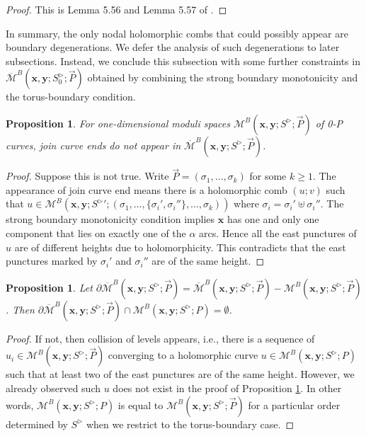 \documentclass{amsart}
\newtheorem{prop}[thm]{Proposition}
\theoremstyle{definition}
\theoremstyle{remark}
\numberwithin{equation}{section}
\numberwithin{equation}{section} \makeatletter
\begin{document}
\begin{proof}
This is Lemma 5.56 and Lemma 5.57 of \cite{LOT18}.
\end{proof}

In summary, the only nodal holomorphic combs that could possibly appear are boundary degenerations. We defer the analysis of such degenerations to later subsections. Instead, we conclude this subsection with some further constraints in $\overline{\mathcal{M}}^B(\bm{x},\bm{y};S_0^\triangleright;\overrightarrow{P})$ obtained by combining the strong boundary monotonicity and the torus-boundary condition. 

\begin{prop}\label{Proposition, no join curve end}
For one-dimensional moduli spaces $\mathcal{M}^B(\bm{x},\bm{y};S^\triangleright;\overrightarrow{P})$ of 0-P curves, join curve ends do not appear in $\overline{\mathcal{M}}^B(\bm{x},\bm{y};S^\triangleright;\overrightarrow{P})$.
\end{prop}

\begin{proof}
Suppose this is not true. Write $\overrightarrow{P}=(\sigma_1,\ldots,\sigma_k)$ for some $k\geq 1$. The appearance of join curve end means there is a holomorphic comb $(u;v)$ such that $u\in \mathcal{M}^B(\bm{x},\bm{y};{S^\triangleright}';(\sigma_1,\ldots,\{\sigma_i',\sigma_i''\},\ldots,\sigma_k))$ where $\sigma_i=\sigma_i'\uplus\sigma_i''$. The strong boundary monotonicity condition implies $\bm{x}$ has one and only one component that lies on exactly one of the $\alpha$ arcs. Hence all the east punctures of $u$ are of different heights due to holomorphicity. This contradicts that the east punctures marked by $\sigma_i'$ and $\sigma_i''$ are of the same height. 
\end{proof}

\begin{prop}\label{Proposition, no collision of levels}
Let $\partial\overline{\mathcal{M}}^B(\bm{x},\bm{y};S^\triangleright;\overrightarrow{P})=\overline{\mathcal{M}}^B(\bm{x},\bm{y};S^\triangleright;\overrightarrow{P})-\mathcal{M}^B(\bm{x},\bm{y};S^\triangleright;\overrightarrow{P})$. Then $\partial\overline{\mathcal{M}}^B(\bm{x},\bm{y};S^\triangleright;\overrightarrow{P})\cap \mathcal{M}^B(\bm{x},\bm{y};S^\triangleright;P)=\emptyset$.
\end{prop}

\begin{proof}
If not, then collision of levels appears, i.e., there is a sequence of $u_i\in\mathcal{M}^B(\bm{x},\bm{y};S^\triangleright;\overrightarrow{P})$ converging to a holomorphic curve $u\in \mathcal{M}^B(\bm{x},\bm{y};S^\triangleright;P)$ such that at least two of the east punctures are of the same height. However, we already observed such $u$ does not exist in the proof of Proposition \ref{Proposition, no join curve end}. In other words, $\mathcal{M}^B(\bm{x},\bm{y};S^\triangleright;P)$ is equal to $\mathcal{M}^B(\bm{x},\bm{y};S^\triangleright;\overrightarrow{P})$ for a particular order determined by $S^\triangleright$ when we restrict to the torus-boundary case.
\end{proof}
\end{document}
